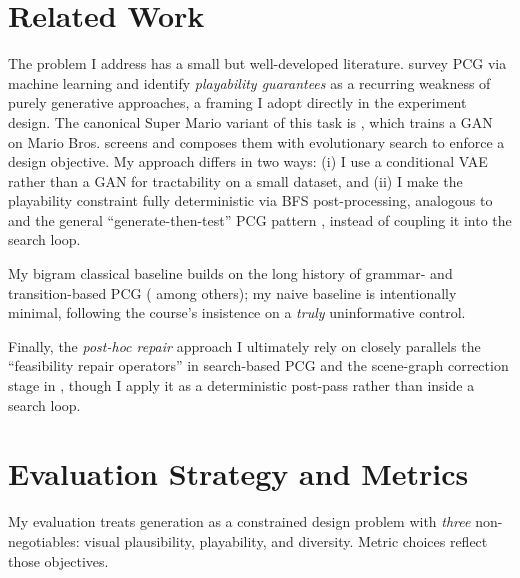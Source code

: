 \documentclass[11pt]{article}
\begin{document}
\section{Related Work}

The problem I address has a small but well-developed literature.
\citet{summerville2018procedural} survey PCG via machine learning and
identify \emph{playability guarantees} as a recurring weakness of
purely generative approaches, a framing I adopt directly in the
experiment design. The canonical Super Mario variant of this task is
\citet{volz2018evolving}, which trains a GAN on Mario Bros. screens
and composes them with evolutionary search to enforce a design
objective. My approach differs in two ways: (i) I use a conditional
VAE \citep{kingma2014auto,sohn2015learning} rather than a GAN for
tractability on a small dataset, and (ii) I make the playability
constraint fully deterministic via BFS post-processing, analogous to
\citet{cooper2013paris} and the general ``generate-then-test'' PCG
pattern \citep{togelius2011search}, instead of coupling it into the
search loop.

My bigram classical baseline builds on the long history of grammar-
and transition-based PCG (\citet{smith2010tanagra} among others); my
naive baseline is intentionally minimal, following the course's
insistence on a \emph{truly} uninformative control.

Finally, the \emph{post-hoc repair} approach I ultimately rely on
closely parallels the ``feasibility repair operators'' in search-based
PCG \citep{togelius2011search} and the scene-graph correction stage in
\citet{earle2021illuminating}, though I apply it as a deterministic
post-pass rather than inside a search loop.

\section{Evaluation Strategy and Metrics}
\label{sec:eval}

My evaluation treats generation as a constrained design problem with
\emph{three} non-negotiables: visual plausibility, playability, and
diversity. Metric choices reflect those objectives.
\end{document}
